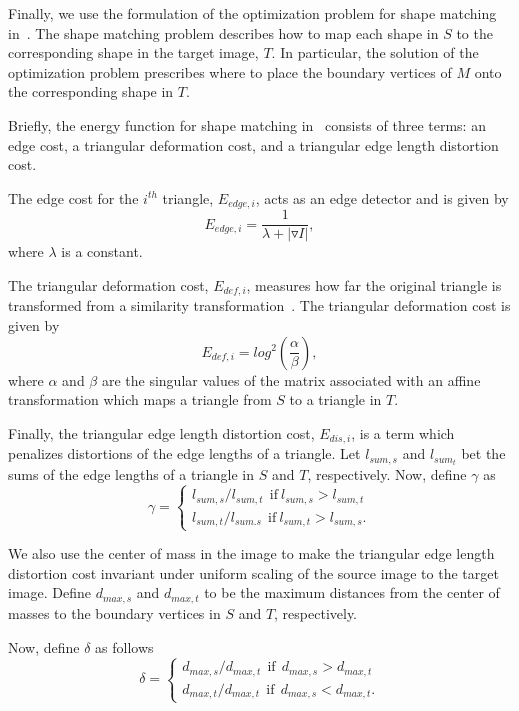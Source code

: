 Finally, we use the formulation of the optimization problem for shape 
matching in~\cite{jibum_kim_isvc_2010}.  The shape matching problem 
describes how to map each shape in $S$ to the corresponding shape in the 
target image, $T$.  In particular, the solution of the optimization 
problem prescribes where to place the boundary vertices of $M$ onto the 
corresponding shape in $T$.

Briefly, the energy function for shape matching 
in~\cite{jibum_kim_isvc_2010} consists of three terms:  an edge cost, a 
triangular deformation cost, and a triangular edge length distortion cost.

The edge cost for the $i^{th}$ triangle, $E_{edge,i}$, acts as an edge 
detector and  is given by 
$$
E_{edge,i}=\frac{1}{\lambda +\left |  \triangledown I \right |},
$$
where $\lambda$ is a constant.

The triangular deformation cost, $E_{def,i}$, measures how far the 
original triangle is transformed from a similarity 
transformation~\cite{widrow_1}.  The triangular deformation cost
is given by
$$
E_{def,i}=log^{2}\left ( \frac{\alpha }{\beta } \right ),
$$
where $\alpha$ and $\beta$ are the singular values of the matrix 
associated with an affine transformation which maps a triangle from $S$ to 
a triangle in $T$.  

Finally, the triangular edge length distortion cost, $E_{dis,i}$, is a 
term which penalizes distortions of the edge lengths of a triangle.  Let
$l_{sum,s}$ and $l_{sum_t}$ bet the sums of the edge lengths of a triangle 
in $S$ and $T$, respectively.  Now, define $\gamma$ as 
$$
\gamma =\left\{\begin{matrix}
l_{sum, s}/l_{sum, t} \  \ \mathrm{if} \   l_{sum, s} >   l_{sum, t} \\
l_{sum, t}/l_{sum. s} \  \ \mathrm{if} \   l_{sum, t} >  l_{sum, s}.
\end{matrix}\right.
$$

We also use the center of mass in the image to make the triangular edge 
length distortion cost invariant under uniform scaling of the source image 
to the target image.  Define $d_{max, s}$ and $d_{max, t}$ to be the 
maximum distances from the center of masses to the boundary vertices in 
$S$ and $T$, respectively.

Now, define $\delta$ as follows
$$
\delta =\left\{\begin{matrix}
d_{max,s} / d_{max,t} \ \ \mathrm{if} \ \ d_{max,s} > d_{max,t}\\
d_{max,t} / d_{max,t} \ \ \mathrm{if} \ \ d_{max,s} < d_{max,t}.
\end{matrix}\right.
$$

